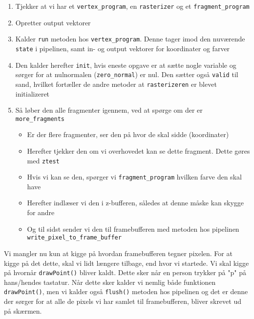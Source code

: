 \documentclass[a4paper, 10pt]{article}
\begin{document}
\begin{enumerate}
\item Tjekker at vi har et \texttt{vertex\_program}, en \texttt{rasterizer} og et \texttt{fragment\_program}
\item Opretter output vektorer
\item Kalder \texttt{run} metoden hos \texttt{vertex\_program}. Denne tager imod den nuværende \texttt{state} i pipelinen, samt in- og output vektorer for koordinater og farver
\item Den kalder herefter \texttt{init}, hvis eneste opgave er at sætte nogle variable og sørger for at nulnormalen (\texttt{zero\_normal}) er nul. Den sætter også \texttt{valid} til sand, hvilket fortæller de andre metoder at \texttt{rasterizeren} er blevet initializeret
\item Så løber den alle fragmenter igennem, ved at spørge om der er \texttt{more\_fragments}
    \begin{itemize}
    \item Er der flere fragmenter, ser den på hvor de skal sidde (koordinater)
    \item Herefter tjekker den om vi overhovedet kan se dette fragment. Dette gøres med \texttt{ztest}
    \item Hvis vi kan se den, spørger vi \texttt{fragment\_program} hvilken farve den skal have
    \item Herefter indlæser vi den i z-bufferen, således at denne måske kan skygge for andre
    \item Og til sidst sender vi den til framebufferen med metoden hos pipelinen \texttt{write\_pixel\_to\_frame\_buffer}
    \end{itemize}
\end{enumerate}

Vi mangler nu kun at kigge på hvordan framebufferen tegner pixelen.
For at kigge på det dette, skal vi lidt længere tilbage, end hvor vi startede.
Vi skal kigge på hvornår \texttt{drawPoint()} bliver kaldt.
Dette sker når en person trykker på "p" på hans/hendes tastatur.
Når dette sker kalder vi nemlig både funktionen \texttt{drawPoint()}, men vi kalder også \texttt{flush()} metoden hos pipelinen og det er denne der sørger for at alle de pixels vi har samlet til framebufferen, bliver skrevet ud på skærmen.
\end{document}
